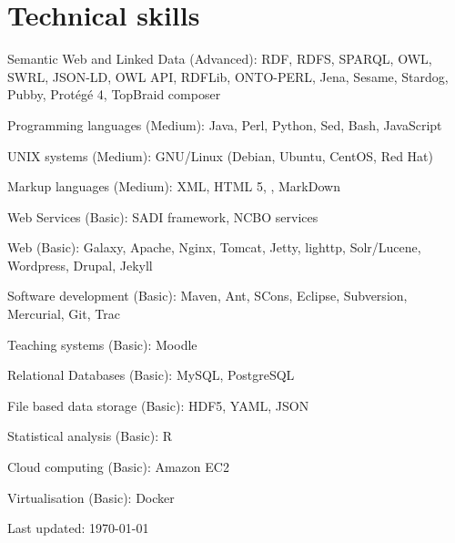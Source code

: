 \documentclass[11pt,fullpage]{article}
\renewenvironment{itemize}{
  \begin{list}{}{
    \setlength{\leftmargin}{1.5em} 
  }  
}{
  \end{list}
}
\begin{document}
\section*{Technical skills}
\begin{itemize}
	\item Semantic Web and Linked Data (Advanced): RDF, RDFS, SPARQL, OWL, SWRL, JSON-LD, OWL API, RDFLib, ONTO-PERL, Jena, Sesame, Stardog, Pubby, Prot\'eg\'e 4, TopBraid composer
	\item Programming languages (Medium): Java, Perl, Python, Sed, Bash, JavaScript 
	\item UNIX systems (Medium): GNU/Linux (Debian, Ubuntu, CentOS, Red Hat) 
	\item Markup languages (Medium): XML, HTML 5, \LaTeXe, MarkDown
	\item Web Services (Basic): SADI framework, NCBO services
	\item Web (Basic): Galaxy, Apache, Nginx, Tomcat, Jetty, lighttp, Solr/Lucene, Wordpress, Drupal, Jekyll
	\item Software development (Basic): Maven, Ant, SCons, Eclipse, Subversion, Mercurial, Git, Trac
	\item Teaching systems (Basic): Moodle
	\item Relational Databases (Basic): MySQL, PostgreSQL
	\item File based data storage (Basic): HDF5, YAML, JSON
	\item Statistical analysis (Basic): R
	\item Cloud computing (Basic): Amazon EC2
	\item Virtualisation (Basic): Docker
\end{itemize}





\bigskip
\begin{center}
  \begin{footnotesize}
    Last updated: \today
  \end{footnotesize}
\end{center}



\end{document}
